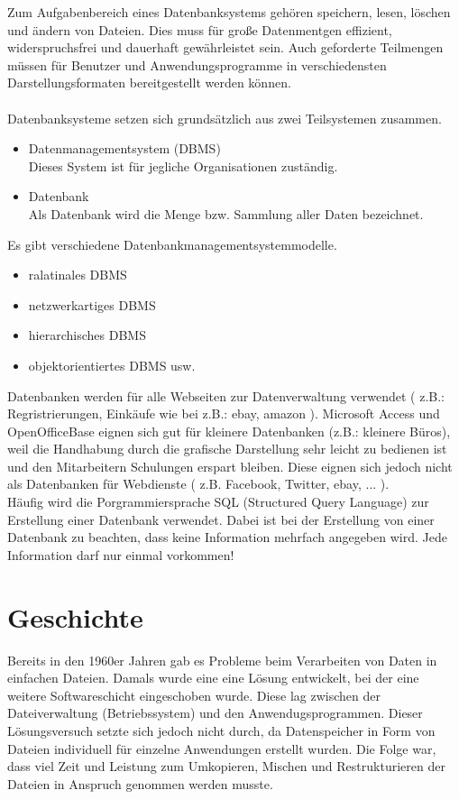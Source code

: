 \documentclass[12pt,a4paper]{report}
\begin{document}
\begin{onehalfspace}
Zum Aufgabenbereich eines Datenbanksystems gehören speichern, lesen, löschen und ändern von Dateien. Dies muss für große Datenmentgen effizient, widerspruchsfrei und dauerhaft gewährleistet sein. Auch geforderte Teilmengen müssen für Benutzer und Anwendungsprogramme in verschiedensten Darstellungsformaten bereitgestellt werden können.\\
\\Datenbanksysteme setzen sich grundsätzlich aus zwei Teilsystemen zusammen.
\begin{itemize}
\item Datenmanagementsystem (DBMS)\\
Dieses System ist für jegliche Organisationen zuständig.
\item Datenbank\\
Als Datenbank wird die Menge bzw. Sammlung aller Daten bezeichnet.
\end{itemize} 
Es gibt verschiedene Datenbankmanagementsystemmodelle.
\begin{itemize}
\item ralatinales DBMS
\item netzwerkartiges DBMS
\item hierarchisches DBMS
\item objektorientiertes DBMS usw.
\end{itemize}
Datenbanken werden für alle Webseiten zur Datenverwaltung verwendet ( z.B.: Regristrierungen, Einkäufe wie bei z.B.: ebay, amazon ).
Microsoft Access und OpenOfficeBase eignen sich gut für kleinere Datenbanken (z.B.: kleinere Büros), weil die Handhabung durch die grafische Darstellung sehr leicht zu bedienen ist und den Mitarbeitern Schulungen erspart bleiben.
Diese eignen sich jedoch nicht als Datenbanken für Webdienste ( z.B. Facebook, Twitter, ebay, ... ).\\

Häufig wird die Porgrammiersprache SQL (Structured Query Language) zur Erstellung einer Datenbank verwendet. Dabei ist bei der Erstellung von einer Datenbank zu beachten, dass keine Information mehrfach angegeben wird. Jede Information darf nur einmal vorkommen!

\section{Geschichte}
Bereits in den 1960er Jahren gab es Probleme beim Verarbeiten von Daten in einfachen Dateien. Damals wurde eine eine Lösung entwickelt, bei der eine weitere Softwareschicht eingeschoben wurde. Diese lag zwischen der Dateiverwaltung (Betriebssystem) und den Anwendugsprogrammen. Dieser Lösungsversuch setzte sich jedoch nicht durch, da Datenspeicher in Form von Dateien individuell für einzelne Anwendungen erstellt wurden. Die Folge war, dass viel Zeit und Leistung zum Umkopieren, Mischen und Restrukturieren der Dateien in Anspruch genommen werden musste.\\


\end{onehalfspace}
\end{document}
